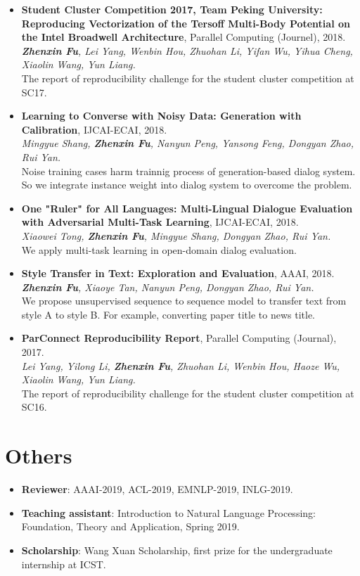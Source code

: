\documentclass[letterpaper]{article}
\begin{document}
\begin{itemize}
\item \textbf{Student Cluster Competition 2017, Team Peking University: Reproducing Vectorization of the Tersoff Multi-Body Potential on the Intel Broadwell Architecture}, Parallel Computing (Journel), 2018. \\
{\it \textbf{Zhenxin Fu}, Lei Yang, Wenbin Hou, Zhuohan Li, Yifan Wu, Yihua Cheng, Xiaolin Wang, Yun Liang.} \\
  The report of reproducibility challenge for the student cluster competition at SC17.

\item \textbf{Learning to Converse with Noisy Data: Generation with Calibration}, IJCAI-ECAI, 2018. \\
  {\it Mingyue Shang, \textbf{Zhenxin Fu}, Nanyun Peng, Yansong Feng, Dongyan Zhao, Rui Yan.}  \\
  Noise training cases harm trainnig process of generation-based dialog system. So we integrate instance weight into dialog system to overcome the problem.

\item \textbf{One "Ruler" for All Languages: Multi-Lingual Dialogue Evaluation with Adversarial Multi-Task Learning}, IJCAI-ECAI, 2018. \\
  {\it Xiaowei Tong, \textbf{Zhenxin Fu}, Mingyue Shang, Dongyan Zhao, Rui Yan.} \\
  We apply multi-task learning in open-domain dialog evaluation.

\item \textbf{Style Transfer in Text: Exploration and Evaluation}, AAAI, 2018. \\
  {\it \textbf{Zhenxin Fu}, Xiaoye Tan, Nanyun Peng, Dongyan Zhao, Rui Yan.} \\
  We propose unsupervised sequence to sequence model to transfer text from style A to style B. For example, converting paper title to news title.
  
\item \textbf{ParConnect Reproducibility Report}, Parallel Computing (Journal), 2017.\\
  {\it Lei Yang, Yilong Li, \textbf{Zhenxin Fu}, Zhuohan Li, Wenbin Hou, Haoze Wu, Xiaolin Wang, Yun Liang.} \\
  The report of reproducibility challenge for the student cluster competition at SC16.
\end{itemize}


\section*{Others}
\begin{itemize}
  \item \textbf{Reviewer}: AAAI-2019, ACL-2019, EMNLP-2019, INLG-2019.
  \item \textbf{Teaching assistant}: Introduction to Natural Language Processing: Foundation, Theory and Application, Spring 2019.
  \item \textbf{Scholarship}: Wang Xuan Scholarship, first prize for the undergraduate internship at ICST.
\end{itemize}
\end{document}
